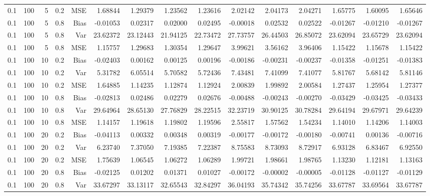 \begin{table}[!htbp]
\begin{tabular}{lrrrrrrrrrrrrrr}
0.1 & 100 &  5 & 0.2 & MSE & 1.68844 & 1.29379 & 1.23562 & 1.23616 & 2.02142 & 2.04173 & 2.04271 & 1.65775 & 1.60095 & 1.65646 \\
0.1 & 100 &  5 & 0.8 & Bias & -0.01053 & 0.02317 & 0.02000 & 0.02495 & -0.00018 & 0.02532 & 0.02522 & -0.01267 & -0.01210 & -0.01267 \\
0.1 & 100 &  5 & 0.8 & Var & 23.62372 & 23.12443 & 21.94125 & 22.73472 & 27.73757 & 26.44503 & 26.85072 & 23.62094 & 23.65729 & 23.62094 \\
0.1 & 100 &  5 & 0.8 & MSE & 1.15757 & 1.29683 & 1.30354 & 1.29647 & 3.99621 & 3.56162 & 3.96406 & 1.15422 & 1.15678 & 1.15422 \\
0.1 & 100 & 10 & 0.2 & Bias & -0.02403 & 0.00162 & 0.00125 & 0.00196 & -0.00186 & -0.00231 & -0.00237 & -0.01358 & -0.01251 & -0.01383 \\
0.1 & 100 & 10 & 0.2 & Var & 5.31782 & 6.05514 & 5.70582 & 5.72436 & 7.43481 & 7.41099 & 7.41077 & 5.81767 & 5.68142 & 5.81146 \\
0.1 & 100 & 10 & 0.2 & MSE & 1.64885 & 1.14235 & 1.12874 & 1.12924 & 2.00839 & 1.99892 & 2.00584 & 1.27437 & 1.25954 & 1.27377 \\
0.1 & 100 & 10 & 0.8 & Bias & -0.02813 & 0.02486 & 0.02279 & 0.02676 & -0.00488 & -0.00243 & -0.00270 & -0.03429 & -0.03425 & -0.03433 \\
0.1 & 100 & 10 & 0.8 & Var & 29.64964 & 28.65130 & 27.76829 & 28.22515 & 32.23719 & 30.90125 & 30.78284 & 29.64194 & 29.67971 & 29.64239 \\
0.1 & 100 & 10 & 0.8 & MSE & 1.14157 & 1.19618 & 1.19802 & 1.19596 & 2.55817 & 1.57562 & 1.54234 & 1.14010 & 1.14206 & 1.14003 \\
0.1 & 100 & 20 & 0.2 & Bias & -0.04113 & 0.00332 & 0.00348 & 0.00319 & -0.00177 & -0.00172 & -0.00180 & -0.00741 & 0.00136 & -0.00716 \\
0.1 & 100 & 20 & 0.2 & Var & 6.23740 & 7.37050 & 7.19385 & 7.22387 & 8.75583 & 8.73093 & 8.72917 & 6.93128 & 6.83467 & 6.92550 \\
0.1 & 100 & 20 & 0.2 & MSE & 1.75639 & 1.06545 & 1.06272 & 1.06289 & 1.99721 & 1.98661 & 1.98765 & 1.13230 & 1.12181 & 1.13163 \\
0.1 & 100 & 20 & 0.8 & Bias & -0.02125 & 0.01202 & 0.01371 & 0.01027 & -0.00172 & -0.00002 & -0.00005 & -0.01128 & -0.01127 & -0.01129 \\
0.1 & 100 & 20 & 0.8 & Var & 33.67297 & 33.13117 & 32.65543 & 32.84297 & 36.04193 & 35.74342 & 35.74256 & 33.67787 & 33.69564 & 33.67787 \\

\end{tabular}
\end{table}
